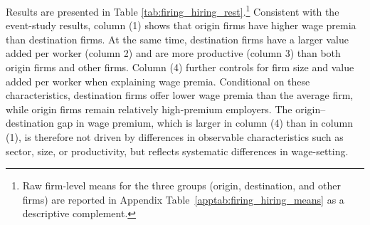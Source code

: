 Results are presented in Table \ref{tab:firing_hiring_rest}.\footnote{Raw firm-level means for the three groups (origin, destination, and other firms) are reported in Appendix Table~\ref{apptab:firing_hiring_means} as a descriptive complement.} %
Consistent with the event-study results, column (1) shows that origin firms have higher wage premia than destination firms. At the same time, destination firms have a larger value added per worker (column 2) and are more productive (column 3) than both origin firms and other firms. Column (4) further controls for firm size and value added per worker when explaining wage premia. Conditional on these characteristics, destination firms offer lower wage premia than the average firm, while origin firms remain relatively high-premium employers. The origin--destination gap in wage premium, which is larger in column (4) than in column (1), is therefore not driven by differences in observable characteristics such as sector, size, or productivity, but reflects systematic differences in wage-setting. 

